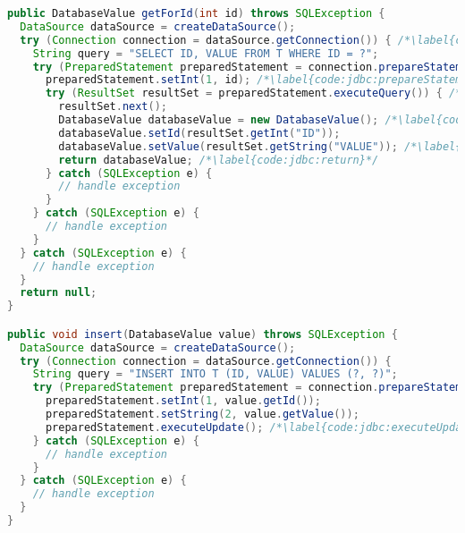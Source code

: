 
\begin{lstlisting}[language=Java, caption={Example of query and insert operations using JDBC API \citep{JDBC_OVERVIEW}}, label={code:jdbc}]
public DatabaseValue getForId(int id) throws SQLException {
  DataSource dataSource = createDataSource();
  try (Connection connection = dataSource.getConnection()) { /*\label{code:jdbc:connection}*/
    String query = "SELECT ID, VALUE FROM T WHERE ID = ?";
    try (PreparedStatement preparedStatement = connection.prepareStatement(query)) { /*\label{code:jdbc:prepareStatement:begin}*/
      preparedStatement.setInt(1, id); /*\label{code:jdbc:prepareStatement:end}*/
      try (ResultSet resultSet = preparedStatement.executeQuery()) { /*\label{code:jdbc:executeQuery}*/
        resultSet.next();
        DatabaseValue databaseValue = new DatabaseValue(); /*\label{code:jdbc:mapping:begin}*/
        databaseValue.setId(resultSet.getInt("ID"));
        databaseValue.setValue(resultSet.getString("VALUE")); /*\label{code:jdbc:mapping:end}*/
        return databaseValue; /*\label{code:jdbc:return}*/
      } catch (SQLException e) {
        // handle exception
      }
    } catch (SQLException e) {
      // handle exception
    }
  } catch (SQLException e) {
    // handle exception
  }
  return null;
}

public void insert(DatabaseValue value) throws SQLException {
  DataSource dataSource = createDataSource();
  try (Connection connection = dataSource.getConnection()) { 
    String query = "INSERT INTO T (ID, VALUE) VALUES (?, ?)";
    try (PreparedStatement preparedStatement = connection.prepareStatement(query)) {
      preparedStatement.setInt(1, value.getId());
      preparedStatement.setString(2, value.getValue());
      preparedStatement.executeUpdate(); /*\label{code:jdbc:executeUpdate}*/
    } catch (SQLException e) {
      // handle exception
    }
  } catch (SQLException e) {
    // handle exception
  }
}
\end{lstlisting}
